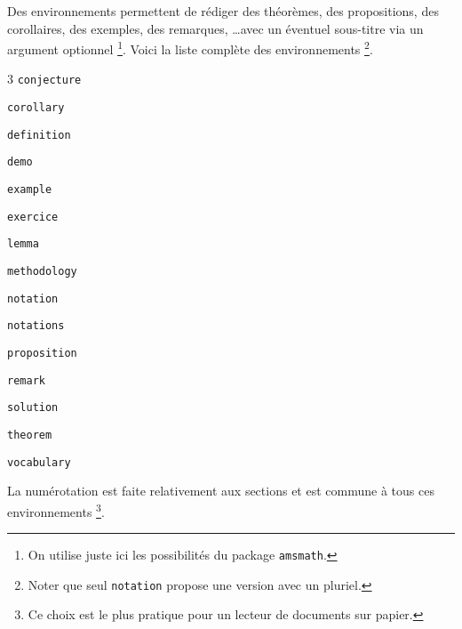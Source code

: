 Des environnements permettent de rédiger des théorèmes, des propositions, des corollaires, des exemples, des remarques, \dots avec un éventuel sous-titre via un argument optionnel
\footnote{
	On utilise juste ici les possibilités du package \texttt{amsmath}.
}. Voici la liste complète des environnements
\footnote{
	Noter que seul \texttt{notation} propose une version avec un pluriel.
}.

\begin{multicols-sep}{3}
	\verb+conjecture+

	\verb+corollary+

	\verb+definition+

	\verb+demo+

	\verb+example+

	\verb+exercice+
	
	\verb+lemma+

	\verb+methodology+

	\verb+notation+
	
	\verb+notations+

	\verb+proposition+

	\verb+remark+

	\verb+solution+

	\verb+theorem+

	\verb+vocabulary+
	
\end{multicols-sep}


\medskip


La numérotation est faite relativement aux sections et est commune à tous ces environnements
\footnote{
	Ce choix est le plus pratique pour un lecteur de documents sur papier.
}.
